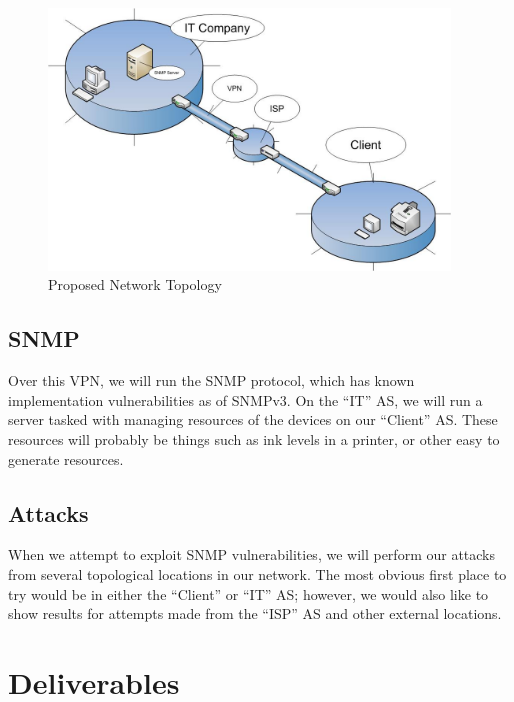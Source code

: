 \documentclass[pdftex, 11pt]{article}
\begin{document}
\begin{figure}
  \centering
  \includegraphics[width=0.95\textwidth, scale=1]{./figures/NetworkTopology.png}
  \caption{Proposed Network Topology}
\end{figure}

\subsection{SNMP}
Over this VPN, we will run the SNMP protocol, which has known 
implementation vulnerabilities as of SNMPv3. On the “IT” AS, we will 
run a server tasked with managing resources of the devices on our 
“Client” AS.  These resources will probably be things such as ink 
levels in a printer, or other easy to generate resources.

\subsection{Attacks}
When we attempt to exploit SNMP vulnerabilities, we will perform our 
attacks from several topological locations in our network.  The most 
obvious first place to try would be in either the “Client” or “IT” AS; 
however, we would also like to show results for attempts made from 
the “ISP” AS and other external locations.

\section{Deliverables}
\end{document}
